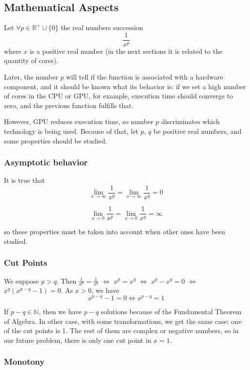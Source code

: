 \documentclass{article}
\begin{document}
\subsection{Mathematical Aspects}

Let \(\forall p \in \mathbb{R^+} \cup \{0\}\) the real numbers succession
\[
\frac{1}{{x^p}}
\]
where $x$ is a positive real number (in the next sections it is related to the quantity of cores).

Later, the number $p$ will tell if the function is associated with a hardware component, and it should be known what its behavior is: if we set a high number of cores in the CPU or GPU, for example, execution time should converge to zero, and the previous function fulfills that.

However, GPU reduces execution time, so number $p$ discriminates which technology is being used. Because of that, let $p$, $q$ be positive real numbers, and some properties should be studied.

\subsubsection{Asymptotic behavior}

It is true that
\[
\lim_{{x \to \infty}} \frac{1}{{x^p}}=\lim_{{x \to \infty}} \frac{1}{{x^q}}=0
\]

\[
\lim_{{x \to 0}} \frac{1}{{x^p}}=\lim_{{x \to 0}} \frac{1}{{x^q}}=\infty
\]

so these properties must be taken into account when other ones have been studied.

\subsubsection{Cut Points}

We suppose $p > q$. Then $\frac{1}{{x^p}}=\frac{1}{x^q}$ $\Leftrightarrow$ ${x^p}={x^q}$ $\Leftrightarrow$ ${x^p}-{x^q}=0$ $\Leftrightarrow$ ${x^q}({x^{p-q}}-1)=0$. As $x>0$, we have
\[
{x^{p-q}}-1=0 \Leftrightarrow {x^{p-q}}=1
\]

If ${p-q} \in \mathbb{N}$, then we have $p-q$ solutions because of the Fundamental Theorem of Algebra. In other case, with some transformations, we get the same case: one of the cut points is 1. The rest of them are complex or negative numbers, so in our future problem, there is only one cut point in $x=1$.

\subsubsection{Monotony}
\end{document}
